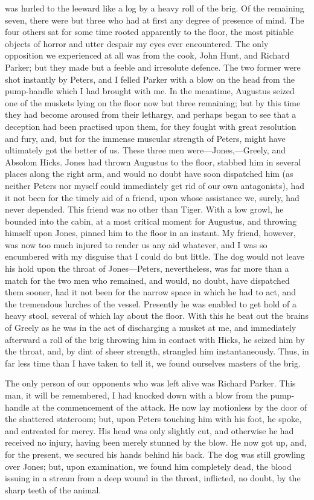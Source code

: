 was hurled to the leeward like a log by a heavy roll of the brig. Of the
remaining seven, there were but three who had at first any degree of presence of
mind. The four others sat for some time rooted apparently to the floor, the most
pitiable objects of horror and utter despair my eyes ever encountered. The only
opposition we experienced at all was from the cook, John Hunt, and Richard
Parker; but they made but a feeble and irresolute defence. The two former were
shot instantly by Peters, and I felled Parker with a blow on the head from the
pump-handle which I had brought with me. In the meantime, Augustus seized one of
the muskets lying on the floor now but three remaining; but by this time they
had become aroused from their lethargy, and perhaps began to see that a
deception had been practised upon them, for they fought with great resolution
and fury, and, but for the immense muscular strength of Peters, might have
ultimately got the better of us. These three men were---Jones,---Greely, and
Absolom Hicks. Jones had thrown Augustus to the floor, stabbed him in several
places along the right arm, and would no doubt have soon dispatched him (as
neither Peters nor myself could immediately get rid of our own antagonists), had
it not been for the timely aid of a friend, upon whose assistance we, surely,
had never depended. This friend was no other than Tiger. With a low growl, he
bounded into the cabin, at a most critical moment for Augustus, and throwing
himself upon Jones, pinned him to the floor in an instant. My friend, however,
was now too much injured to render us any aid whatever, and I was so encumbered
with my disguise that I could do but little. The dog would not leave his hold
upon the throat of Jones---Peters, nevertheless, was far more than a match for
the two men who remained, and would, no doubt, have dispatched them sooner, had
it not been for the narrow space in which he had to act, and the tremendous
lurches of the vessel. Presently he was enabled to get hold of a heavy stool,
several of which lay about the floor. With this he beat out the brains of Greely
as he was in the act of discharging a musket at me, and immediately afterward a
roll of the brig throwing him in contact with Hicks, he seized him by the
throat, and, by dint of sheer strength, strangled him instantaneously. Thus, in
far less time than I have taken to tell it, we found ourselves masters of the
brig. 

The only person of our opponents who was left alive was Richard Parker. This
man, it will be remembered, I had knocked down with a blow from the pump-handle
at the commencement of the attack. He now lay motionless by the door of the
shattered stateroom; but, upon Peters touching him with his foot, he spoke, and
entreated for mercy. His head was only slightly cut, and otherwise he had
received no injury, having been merely stunned by the blow. He now got up, and,
for the present, we secured his hands behind his back. The dog was still
growling over Jones; but, upon examination, we found him completely dead, the
blood issuing in a stream from a deep wound in the throat, inflicted, no doubt,
by the sharp teeth of the animal. 

